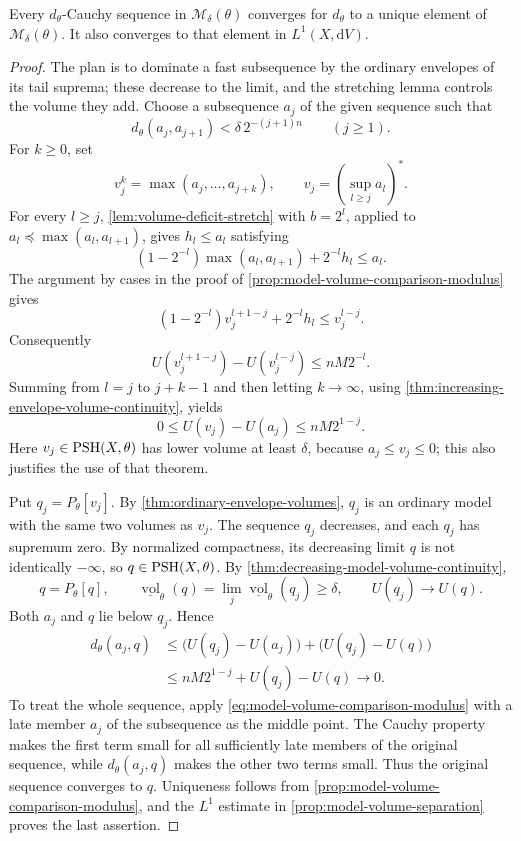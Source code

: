 \begin{theorem}\label{thm:model-volume-cauchy-completeness}
Every $d_\theta$-Cauchy sequence in $\mathcal M_\delta(\theta)$ converges for $d_\theta$ to a unique element of $\mathcal M_\delta(\theta)$. It also converges to that element in $L^1(X,\mathrm{d}V)$.
\end{theorem}
\begin{proof}
The plan is to dominate a fast subsequence by the ordinary envelopes of its tail suprema; these decrease to the limit, and the stretching lemma controls the volume they add. Choose a subsequence $a_j$ of the given sequence such that
\[
 d_\theta(a_j,a_{j+1})<\delta\,2^{-(j+1)n}
 \qquad(j\geq1).
\]
For $k\geq0$, set
\[
 v_j^k=\max(a_j,\ldots,a_{j+k}),\qquad
 v_j=\left(\sup_{l\geq j}a_l\right)^*.
\]
For every $l\geq j$, \cref{lem:volume-deficit-stretch} with $b=2^l$, applied to $a_l\preceq\max(a_l,a_{l+1})$, gives $h_l\leq a_l$ satisfying
\[
 (1-2^{-l})\max(a_l,a_{l+1})+2^{-l}h_l\leq a_l.
\]
The argument by cases in the proof of \cref{prop:model-volume-comparison-modulus} gives
\[
 (1-2^{-l})v_j^{l+1-j}+2^{-l}h_l\leq v_j^{l-j}.
\]
Consequently
\[
 U(v_j^{l+1-j})-U(v_j^{l-j})\leq nM2^{-l}.
\]
Summing from $l=j$ to $j+k-1$ and then letting $k\to\infty$, using \cref{thm:increasing-envelope-volume-continuity}, yields
\[
 0\leq U(v_j)-U(a_j)\leq nM2^{1-j}.
\]
Here $v_j\in\mathrm{PSH}(X,\theta)$ has lower volume at least $\delta$, because $a_j\leq v_j\leq0$; this also justifies the use of that theorem.

Put $q_j=P_\theta[v_j]$. By \cref{thm:ordinary-envelope-volumes}, $q_j$ is an ordinary model with the same two volumes as $v_j$. The sequence $q_j$ decreases, and each $q_j$ has supremum zero. By normalized compactness, its decreasing limit $q$ is not identically $-\infty$, so $q\in\mathrm{PSH}(X,\theta)$. By \cref{thm:decreasing-model-volume-continuity},
\[
 q=P_\theta[q],\qquad
 \underline{\operatorname{vol}}_\theta(q)
 =\lim_j\underline{\operatorname{vol}}_\theta(q_j)\geq\delta,
 \qquad U(q_j)\longrightarrow U(q).
\]
Both $a_j$ and $q$ lie below $q_j$. Hence
\[
 \begin{split}
 d_\theta(a_j,q)
 &\leq\bigl(U(q_j)-U(a_j)\bigr)+\bigl(U(q_j)-U(q)\bigr)\\
 &\leq nM2^{1-j}+U(q_j)-U(q)\longrightarrow0.
 \end{split}
\]
To treat the whole sequence, apply \eqref{eq:model-volume-comparison-modulus} with a late member $a_j$ of the subsequence as the middle point. The Cauchy property makes the first term small for all sufficiently late members of the original sequence, while $d_\theta(a_j,q)$ makes the other two terms small. Thus the original sequence converges to $q$. Uniqueness follows from \cref{prop:model-volume-comparison-modulus}, and the $L^1$ estimate in \cref{prop:model-volume-separation} proves the last assertion.
\end{proof}

